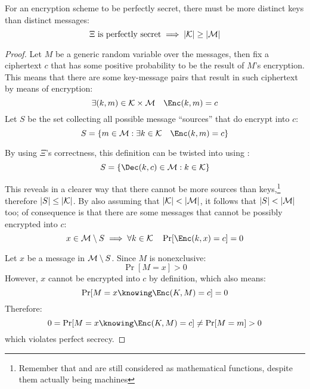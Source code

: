 \begin{theorem}
    For an encryption scheme to be perfectly secret, there must be more distinct keys than distinct messages: 
    \[
        \Xi \textrm{ is perfectly secret} \implies |\mathcal{K}| \geq |\mathcal{M}|
    \]
\end{theorem}
\begin{proof}

    Let $M$ be a generic random variable over the messages, then fix a ciphertext $c$ that has some positive probability to be the result of $M$'s encryption. This means that there are some key-message pairs that result in such ciphertext by means of encryption:
    \[
        \exists (k, m) \in \K \times \M \quad \Enc(k, m) = c
    \]
    Let $S$ be the set collecting all possible message ``sources'' that do encrypt into $c$:
    \[
        S = \{m \in \M : \exists k \in \K \quad \Enc(k, m) = c\}
    \]

    By using $\Xi$'s correctness, this definition can be twisted into using \Dec:
    \[
        S = \{\Dec(k, c) \in \M : k \in \K\}
    \]

    This reveals in a clearer way that there cannot be more sources than keys,\footnote{Remember that \Enc{} and \Dec{} are still considered as mathematical functions, despite them actually being machines} therefore $|S| \leq |\mathcal{K}|$. By also assuming that $|\mathcal{K}| < |\mathcal{M}|$, it follows that $|S| < |\mathcal{M}|$ too; of consequence is that there are some messages that cannot be possibly encrypted into $c$:
    \[
        x \in \M \setminus S \implies \forall k \in \K \quad \Pr[\Enc(k, x) = c] = 0
    \]

    Let $x$ be a message in $\mathcal{M} \setminus S$. Since $M$ is nonexclusive:
    \[
        \Pr[M = x] > 0
    \]
    However, $x$ cannot be encrypted into $c$ by definition, which also means:
    \[
        \Pr[M = x \knowing \Enc(K, M) = c] = 0
    \]
    Therefore:
    \[
        0 = \Pr[M = x \knowing \Enc(K, M) = c] \neq \Pr[M = m] > 0
    \]
    which violates perfect secrecy.
\end{proof}
